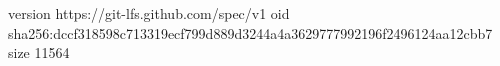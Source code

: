 version https://git-lfs.github.com/spec/v1
oid sha256:dccf318598c713319ecf799d889d3244a4a3629777992196f2496124aa12cbb7
size 11564

